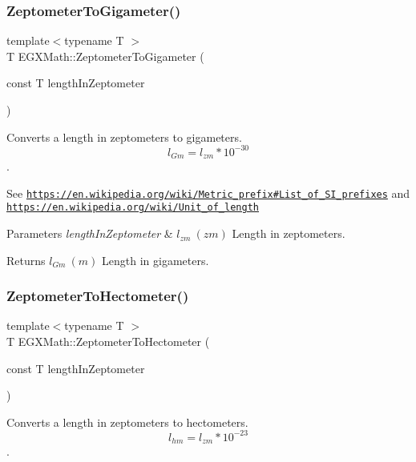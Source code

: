 \subsubsection{\texorpdfstring{Zeptometer\+To\+Gigameter()}{ZeptometerToGigameter()}}
{\footnotesize\ttfamily template$<$typename T $>$ \\
T E\+G\+X\+Math\+::\+Zeptometer\+To\+Gigameter (\begin{DoxyParamCaption}\item[{const T}]{length\+In\+Zeptometer }\end{DoxyParamCaption})}



Converts a length in zeptometers to gigameters. \[ l_{Gm}=l_{zm} * 10^{-30} \]. 

See \href{https://en.wikipedia.org/wiki/Metric_prefix#List_of_SI_prefixes}{\tt https\+://en.\+wikipedia.\+org/wiki/\+Metric\+\_\+prefix\#\+List\+\_\+of\+\_\+\+S\+I\+\_\+prefixes} and \href{https://en.wikipedia.org/wiki/Unit_of_length}{\tt https\+://en.\+wikipedia.\+org/wiki/\+Unit\+\_\+of\+\_\+length} 
\begin{DoxyParams}{Parameters}
{\em length\+In\+Zeptometer} & $ l_{zm}\ (zm)$ Length in zeptometers. \\
\hline
\end{DoxyParams}
\begin{DoxyReturn}{Returns}
$ l_{Gm}\ (m)$ Length in gigameters. 
\end{DoxyReturn}
\mbox{\label{group___e_g_x_math-_conversions-_length_conversions-_s_i-_zeptometer-_s_i_ga4f9724a5c86f9e85aee3bad4d04a7faa}} 
\subsubsection{\texorpdfstring{Zeptometer\+To\+Hectometer()}{ZeptometerToHectometer()}}
{\footnotesize\ttfamily template$<$typename T $>$ \\
T E\+G\+X\+Math\+::\+Zeptometer\+To\+Hectometer (\begin{DoxyParamCaption}\item[{const T}]{length\+In\+Zeptometer }\end{DoxyParamCaption})}



Converts a length in zeptometers to hectometers. \[ l_{hm}=l_{zm} * 10^{-23} \]. 

